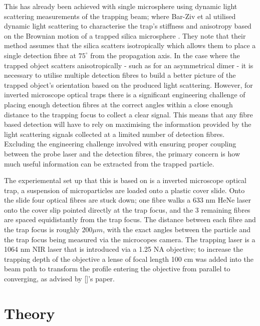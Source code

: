 \documentclass[11pt]{article}
\begin{document}
This has already been achieved with single microsphere using dynamic light scattering measurements of the trapping beam; where Bar-Ziv et al utilised dynamic light scattering to characterise the trap's stiffness and anisotropy based on the Brownian motion of a trapped silica microsphere \cite{1}. They note that their method assumes that the silica scatters isotropically which allows them to place a single detection fibre at $75^\circ$ from the propagation axis. In the case where the trapped object scatters anisotropically - such as for an asymmetrical dimer - it is necessary to utilise multiple detection fibres to build a better picture of the trapped object's orientation based on the produced light scattering. However, for inverted microscope optical traps there is a significant engineering challenge of placing enough detection fibres at the correct angles within a close enough distance to the trapping focus to collect a clear signal. This means that any fibre based detection will have to rely on maximising the information provided by the light scattering signals collected at a limited number of detection fibres. Excluding the engineering challenge involved with ensuring proper coupling between the probe laser and the detection fibres, the primary concern is how much useful information can be extracted from the trapped particle. 

The experiemental set up that this is based on is a inverted microscope optical trap, a suspension of microparticles are loaded onto a plastic cover slide. Onto the slide four optical fibres are stuck down; one fibre walks a 633 nm HeNe laser onto the cover slip pointed directly at the trap focus, and the 3 remaining fibres are spaced equidistantly from the trap focus. The distance between each fibre and the trap focus is roughly $200\mu m$, with the exact angles between the particle and the trap focus being measured via the microcopes camera. The trapping laser is a 1064 nm NIR laser that is introduced via a 1.25 NA objective; to increase the trapping depth of the objective a lense of focal length 100 cm was added into the beam path to transform the profile entering the objective from parallel to converging, as advised by []'s paper. 

\section*{Theory}
\end{document}
